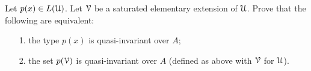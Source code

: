 \documentclass[creche.tex]{subfiles}
\begin{document}

\begin{exercise}\label{ex_quasi_inv_type}
Let $p(x)\in L(\EuScript U)$. Let $\EuScript V$ be a saturated elementary extension of $\EuScript U$. Prove that the following are equivalent:
\begin{itemize}
\item[1.] the type $p(x)$ is quasi-invariant over $A$;
\item[2.] the set $p(\EuScript V)$ is quasi-invariant over $A$ (defined as above with $\EuScript V$ for $\EuScript U$).\QED
\end{itemize}
\end{exercise}
\end{document}
